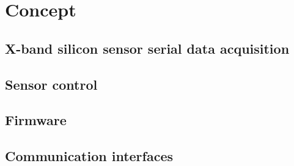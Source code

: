 
\chapter{Concept}\label{CH3}

\section{X-band silicon sensor serial data acquisition}
\section{Sensor control}
\section{Firmware}
\section{Communication interfaces}

